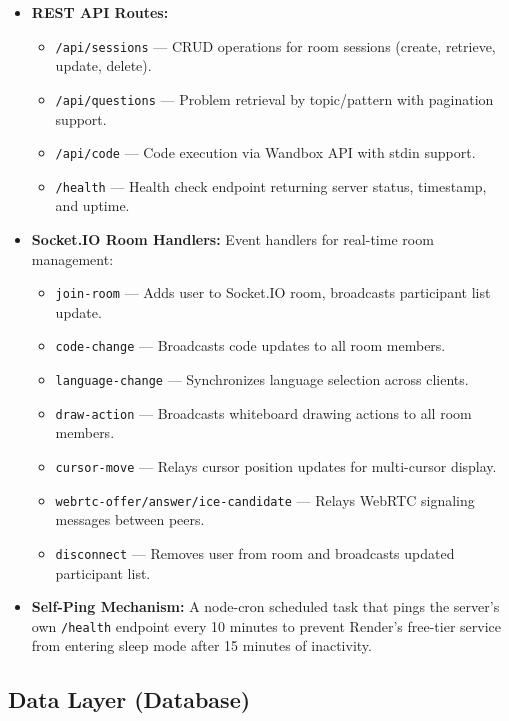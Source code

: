 \begin{itemize}
    \item \textbf{REST API Routes:}
    \begin{itemize}
        \item \texttt{/api/sessions} --- CRUD operations for room sessions (create, retrieve, update, delete).
        \item \texttt{/api/questions} --- Problem retrieval by topic/pattern with pagination support.
        \item \texttt{/api/code} --- Code execution via Wandbox API with stdin support.
        \item \texttt{/health} --- Health check endpoint returning server status, timestamp, and uptime.
    \end{itemize}
    \item \textbf{Socket.IO Room Handlers:} Event handlers for real-time room management:
    \begin{itemize}
        \item \texttt{join-room} --- Adds user to Socket.IO room, broadcasts participant list update.
        \item \texttt{code-change} --- Broadcasts code updates to all room members.
        \item \texttt{language-change} --- Synchronizes language selection across clients.
        \item \texttt{draw-action} --- Broadcasts whiteboard drawing actions to all room members.
        \item \texttt{cursor-move} --- Relays cursor position updates for multi-cursor display.
        \item \texttt{webrtc-offer/answer/ice-candidate} --- Relays WebRTC signaling messages between peers.
        \item \texttt{disconnect} --- Removes user from room and broadcasts updated participant list.
    \end{itemize}
    \item \textbf{Self-Ping Mechanism:} A node-cron scheduled task that pings the server's own \texttt{/health} endpoint every 10 minutes to prevent Render's free-tier service from entering sleep mode after 15 minutes of inactivity.
\end{itemize}

\subsection{Data Layer (Database)}

